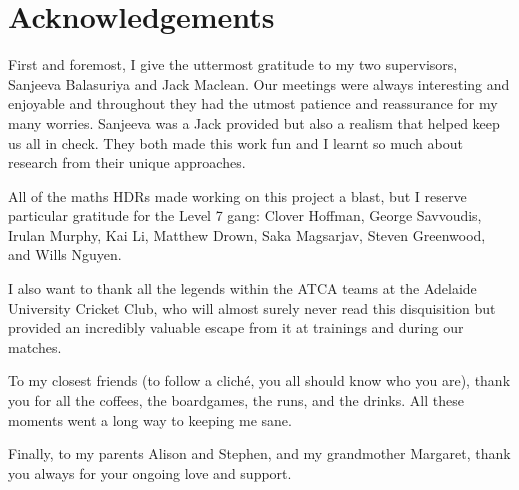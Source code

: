 \chapter{Acknowledgements}
\label{ch:acknowledgements}

First and foremost, I give the uttermost gratitude to my two supervisors, Sanjeeva Balasuriya and Jack Maclean.
Our meetings were always interesting and enjoyable and throughout they had the utmost patience and reassurance for my many worries.
Sanjeeva was a
Jack provided but also a realism that helped keep us all in check.
They both made this work fun and I learnt so much about research from their unique approaches.

All of the maths HDRs made working on this project a blast, but I reserve particular gratitude for the Level 7 gang: Clover Hoffman, George Savvoudis, Irulan Murphy, Kai Li, Matthew Drown, Saka Magsarjav, Steven Greenwood, and Wills Nguyen.

I also want to thank all the legends within the ATCA teams at the Adelaide University Cricket Club, who will almost surely never read this disquisition but provided an incredibly valuable escape from it at trainings and during our matches.

To my closest friends (to follow a clich\'e, you all should know who you are), thank you for all the coffees, the boardgames, the runs, and the drinks.
All these moments went a long way to keeping me sane.

Finally, to my parents Alison and Stephen, and my grandmother Margaret, thank you always for your ongoing love and support.
